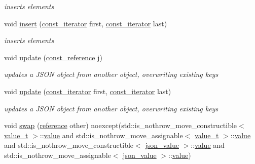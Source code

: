 \begin{DoxyCompactItemize}
\begin{DoxyCompactList}\small\item\em inserts elements \end{DoxyCompactList}\item 
void \hyperlink{classnlohmann_1_1basic__json_a1b0a4e60d56f1fe80501ed941e122892}{insert} (\hyperlink{classnlohmann_1_1basic__json_a41a70cf9993951836d129bb1c2b3126a}{const\+\_\+iterator} first, \hyperlink{classnlohmann_1_1basic__json_a41a70cf9993951836d129bb1c2b3126a}{const\+\_\+iterator} last)
\begin{DoxyCompactList}\small\item\em inserts elements \end{DoxyCompactList}\item 
void \hyperlink{classnlohmann_1_1basic__json_a1cfa9ae5e7c2434cab4cfe69bffffe11}{update} (\hyperlink{classnlohmann_1_1basic__json_a4057c5425f4faacfe39a8046871786ca}{const\+\_\+reference} j)
\begin{DoxyCompactList}\small\item\em updates a J\+S\+ON object from another object, overwriting existing keys \end{DoxyCompactList}\item 
void \hyperlink{classnlohmann_1_1basic__json_a27921dafadb3bbefd180235ec763e3ea}{update} (\hyperlink{classnlohmann_1_1basic__json_a41a70cf9993951836d129bb1c2b3126a}{const\+\_\+iterator} first, \hyperlink{classnlohmann_1_1basic__json_a41a70cf9993951836d129bb1c2b3126a}{const\+\_\+iterator} last)
\begin{DoxyCompactList}\small\item\em updates a J\+S\+ON object from another object, overwriting existing keys \end{DoxyCompactList}\item 
void \hyperlink{classnlohmann_1_1basic__json_a8c9d932353e1ab98a7dc2fc27e002031}{swap} (\hyperlink{classnlohmann_1_1basic__json_ac6a5eddd156c776ac75ff54cfe54a5bc}{reference} other) noexcept(std\+::is\+\_\+nothrow\+\_\+move\+\_\+constructible$<$ \hyperlink{namespacenlohmann_1_1detail_a1ed8fc6239da25abcaf681d30ace4985}{value\+\_\+t} $>$\+::\hyperlink{classnlohmann_1_1basic__json_adcf8ca5079f5db993820bf50036bf45d}{value} and std\+::is\+\_\+nothrow\+\_\+move\+\_\+assignable$<$ \hyperlink{namespacenlohmann_1_1detail_a1ed8fc6239da25abcaf681d30ace4985}{value\+\_\+t} $>$\+::\hyperlink{classnlohmann_1_1basic__json_adcf8ca5079f5db993820bf50036bf45d}{value} and std\+::is\+\_\+nothrow\+\_\+move\+\_\+constructible$<$ \hyperlink{unionnlohmann_1_1basic__json_1_1json__value}{json\+\_\+value} $>$\+::\hyperlink{classnlohmann_1_1basic__json_adcf8ca5079f5db993820bf50036bf45d}{value} and std\+::is\+\_\+nothrow\+\_\+move\+\_\+assignable$<$ \hyperlink{unionnlohmann_1_1basic__json_1_1json__value}{json\+\_\+value} $>$\+::\hyperlink{classnlohmann_1_1basic__json_adcf8ca5079f5db993820bf50036bf45d}{value})

\end{DoxyCompactItemize}
